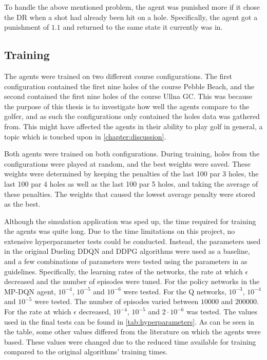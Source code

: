 \documentclass{kththesis}
\begin{document}
To handle the above mentioned problem, the agent was punished more if it chose the DR when a shot had already been hit on a hole. Specifically, the agent got a punishment of $1.1$ and returned to the same state it currently was in. 

\subsection{Training}
\label{sec:rltraining}
The agents were trained on two different course configurations. The first configuration contained the first nine holes of the course Pebble Beach, and the second contained the first nine holes of the course Ullna GC. This was because the purpose of this thesis is to investigate how well the agents compare to the golfer, and as such the configurations only contained the holes data was gathered from. This might have affected the agents in their ability to play golf in general, a topic which is touched upon in \autoref{chapter:discussion}.

Both agents were trained on both configurations. During training, holes from the configurations were played at random, and the best weights were saved. These weights were determined by keeping the penalties of the last 100 par 3 holes, the last 100 par 4 holes as well as the last 100 par 5 holes, and taking the average of these penalties. The weights that caused the lowest average penalty were stored as the best.

Although the simulation application was sped up, the time required for training the agents was quite long. Due to the time limitations on this project, no extensive hyperparameter tests could be conducted. Instead, the parameters used in the original Dueling DDQN and DDPG algorithms were used as a baseline, and a few combinations of parameters were tested using the parameters in \parencite{bester2019mpdqn} as guidelines. Specifically, the learning rates of the networks, the rate at which $\epsilon$ decreased and the number of episodes were tuned. For the policy networks in the MP-DQN agent, $10^{-4}$, $10^{-5}$ and $10^{-6}$ were tested. For the Q networks, $10^{-3}$, $10^{-4}$ and $10^{-5}$ were tested. The number of episodes varied between $10000$ and $200000$. For the rate at which $\epsilon$ decreased, $10^{-4}$, $10^{-5}$ and $2 \cdot 10^{-6}$ was tested. The values used in the final tests can be found in \autoref{tab:hyperparameters}. As can be seen in the table, some other values differed from the literature on which the agents were based. These values were changed due to the reduced time available for training compared to the original algorithms' training times.
\end{document}
